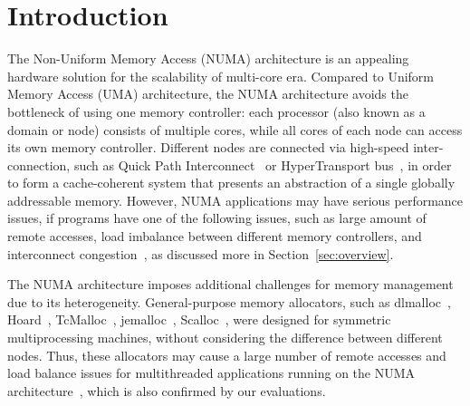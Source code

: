 
\section{Introduction}
\label{sec:intro}

The Non-Uniform Memory Access (NUMA) architecture is an appealing hardware solution for the scalability of multi-core era. Compared to Uniform Memory Access (UMA) architecture, the NUMA architecture avoids the bottleneck of using one memory controller: each processor (also known as a domain or node) consists of multiple cores, while all cores of each node can access its own memory controller. Different nodes are connected via high-speed inter-connection, such as Quick Path Interconnect~\cite{intelqpi} or HyperTransport bus~\cite{hypertransport}, in order to form a cache-coherent system that presents an abstraction of a single globally addressable memory. 
However, NUMA applications may have serious performance issues, if programs have one of the following issues, such as large amount of remote accesses, load imbalance between different memory controllers, and  interconnect congestion~\cite{Blagodurov:2011:CNC:2002181.2002182, Dashti:2013:TMH:2451116.2451157}, as discussed more in Section~\ref{sec:overview}. 

The NUMA architecture imposes additional challenges for memory management due to its heterogeneity. General-purpose memory allocators, such as dlmalloc~\cite{dlmalloc},  Hoard~\cite{Hoard}, TcMalloc~\cite{tcmalloc}, jemalloc~\cite{jemalloc}, Scalloc~\cite{Scalloc}, were designed for symmetric multiprocessing machines, without considering the difference between different nodes. Thus, these allocators may cause a large number of remote accesses and load balance issues for multithreaded applications running on the NUMA architecture~\cite{tcmallocnew, yang2019jarena}, which is also confirmed by our evaluations. 


